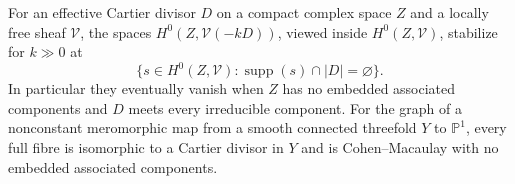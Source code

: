 \begin{proposition}\hypertarget{tag-01GO}{}\label{cdp:st:E17}

For an effective Cartier divisor $D$ on a compact complex
space $Z$ and a locally free sheaf $\mathcal V$, the spaces
$H^0(Z,\mathcal V(-kD))$, viewed inside $H^0(Z,\mathcal V)$,
stabilize for $k\gg0$ at
\[
 \{s\in H^0(Z,\mathcal V):\operatorname{supp}(s)\cap|D|
       =\varnothing\}.
\]
In particular they eventually vanish when $Z$ has no embedded
associated components and $D$ meets every irreducible component.
For the graph of a nonconstant meromorphic map from a smooth connected threefold
$Y$ to $\mathbb P^1$, every full fibre is isomorphic to a Cartier divisor in $Y$
and is Cohen--Macaulay with no embedded associated components.
\end{proposition}


